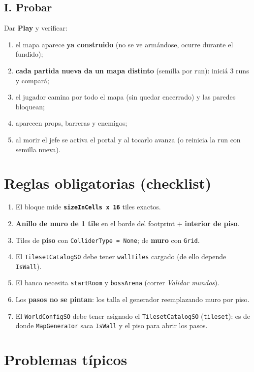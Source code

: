 \documentclass[11pt,a4paper]{article}
\newcommand{\code}[1]{\texttt{#1}}
\begin{document}
\subsection*{I. Probar}
Dar \textbf{Play} y verificar:
\begin{enumerate}[leftmargin=1.4em]
  \item el mapa aparece \textbf{ya construido} (no se ve armándose, ocurre durante el fundido);
  \item \textbf{cada partida nueva da un mapa distinto} (semilla por run): iniciá 3 runs y compará;
  \item el jugador camina por todo el mapa (sin quedar encerrado) y las paredes bloquean;
  \item aparecen props, barreras y enemigos;
  \item al morir el jefe se activa el portal y al tocarlo avanza (o reinicia la run con semilla nueva).
\end{enumerate}

\section{Reglas obligatorias (checklist)}

\begin{enumerate}[leftmargin=1.4em]
  \item El bloque mide \textbf{\code{sizeInCells x 16}} tiles exactos.
  \item \textbf{Anillo de muro de 1 tile} en el borde del footprint + \textbf{interior de piso}.
  \item Tiles de \textbf{piso} con \code{ColliderType = None}; de \textbf{muro} con \code{Grid}.
  \item El \code{TilesetCatalogSO} debe tener \code{wallTiles} cargado (de ello depende \code{IsWall}).
  \item El banco necesita \code{startRoom} y \code{bossArena} (correr \emph{Validar mundos}).
  \item Los \textbf{pasos no se pintan}: los talla el generador reemplazando muro por piso.
  \item El \code{WorldConfigSO} debe tener asignado el \code{TilesetCatalogSO} (\code{tileset}): es de donde
        \code{MapGenerator} saca \code{IsWall} y el piso para abrir los pasos.
\end{enumerate}

\section{Problemas típicos}
\end{document}
